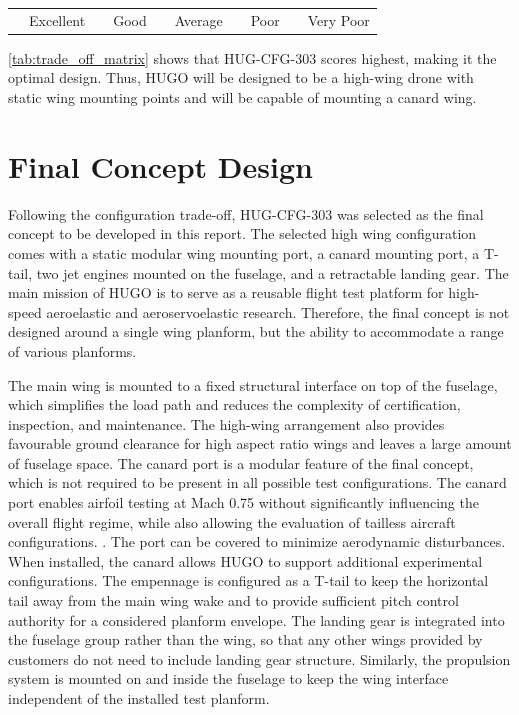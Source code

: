\begin{center}
\begin{tabular}{cccccccccc}
\cellcolor[HTML]{63BE7B}\hspace{0.5cm} & Excellent &
\cellcolor[HTML]{A9D18E}\hspace{0.5cm} & Good &
\cellcolor[HTML]{F4E285}\hspace{0.5cm} & Average &
\cellcolor[HTML]{F4B183}\hspace{0.5cm} & Poor &
\cellcolor[HTML]{F8696B}\hspace{0.5cm} & Very Poor
\end{tabular}
\end{center}

\autoref{tab:trade_off_matrix} shows that HUG-CFG-303 scores highest, making it the optimal design. Thus, HUGO will be designed to be a high-wing drone with static wing mounting points and will be capable of mounting a canard wing.


\section{Final Concept Design}
\label{sec:final_concept_design}

Following the configuration trade-off, HUG-CFG-303 was selected as the final concept to be developed in this report. The selected high wing configuration comes with a static modular wing mounting port, a canard mounting port, a T-tail, two jet engines mounted on the fuselage, and a retractable landing gear. The main mission of HUGO is to serve as a reusable flight test platform for high-speed aeroelastic and aeroservoelastic research. Therefore, the final concept is not designed around a single wing planform, but the ability to accommodate a range of various planforms.

The main wing is mounted to a fixed structural interface on top of the fuselage, which simplifies the load path and reduces the complexity of certification, inspection, and maintenance. The high-wing arrangement also provides favourable ground clearance for high aspect ratio wings and leaves a large amount of fuselage space. The canard port is a modular feature of the final concept, which is not required to be present in all possible test configurations. The canard port enables airfoil testing at Mach 0.75 without significantly influencing the overall flight regime, while also allowing the evaluation of tailless aircraft configurations.
. The port can be covered to minimize aerodynamic disturbances. When installed, the canard allows HUGO to support additional experimental configurations. The empennage is configured as a T-tail to keep the horizontal tail away from the main wing wake and to provide sufficient pitch control authority for a considered planform envelope. The landing gear is integrated into the fuselage group rather than the wing, so that any other wings provided by customers do not need to include landing gear structure. Similarly, the propulsion system is mounted on and inside the fuselage to keep the wing interface independent of the installed test planform.

